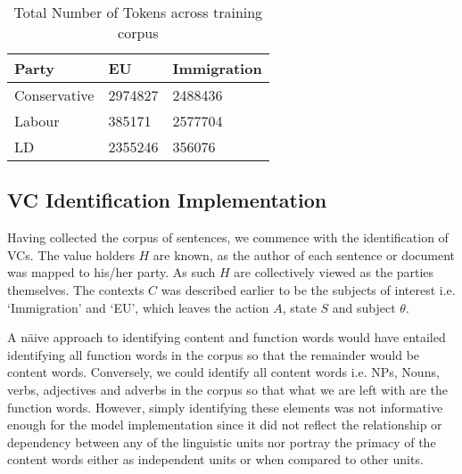 \begin{table}%
\caption{Total Number of Tokens across training corpus}
\label{tab:four}
\begin{minipage}{\columnwidth}
\begin{center}
\begin{tabular}{lll}
  \toprule
  Party	 &  EU & Immigration \\
  \toprule
Conservative	& 2974827	& 2488436	 \\
Labour	& 385171 &	2577704 \\

LD	& 2355246	& 356076 \\
  \bottomrule
\end{tabular}
\end{center}
\bigskip\centering

\end{minipage}
\end{table}%

\subsection{VC Identification Implementation}
Having collected the corpus of sentences, we commence with the identification of VCs. The value holders $H$ are known, as the author of each sentence or document was mapped to his/her party. As such $H$ are collectively viewed as the parties themselves. The contexts $C$ was described earlier to be the subjects of interest i.e. `Immigration' and `EU', which leaves the action $A$, state $S$ and subject $\theta$. 


A n{\"a}ive approach to identifying content and function words would have entailed identifying all function words in the corpus so that the remainder would be content words. Conversely, we could identify all content words i.e. NPs, Nouns, verbs, adjectives and adverbs in the corpus so that what we are left with are the function words. However, simply identifying these elements was not informative enough for the model implementation since it did not reflect the relationship or dependency between any of the linguistic units nor portray the primacy of the content words either as independent units or when compared to other units.


